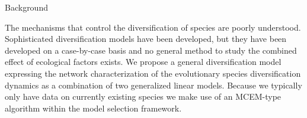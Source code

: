 \documentclass[final]{beamer}
\newlength{\onecolwid}
\begin{document}
\begin{frame}[t]
\begin{columns}[t]
\begin{column}{\onecolwid}
\begin{block}{Background}
  
The mechanisms that control the diversification of species are poorly
understood. Sophisticated diversification models have been developed, but they
have been developed on a case-by-case basis and no general method to study the
combined effect of ecological factors exists.
We propose a general diversification model expressing
the network characterization of the evolutionary species diversification dynamics as a combination of two generalized linear models. 
Because we typically only have data on currently existing species we make use of an MCEM-type algorithm within the model selection framework.





          \end{block}
     

\end{column}
\end{columns}
\end{frame}
\end{document}
